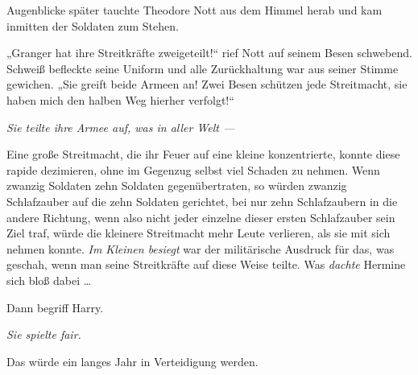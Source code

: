 Augenblicke später tauchte Theodore Nott aus dem Himmel herab und kam inmitten der Soldaten zum Stehen.

„Granger hat ihre Streitkräfte zweigeteilt!“ rief Nott auf seinem Besen schwebend. Schweiß befleckte seine Uniform und alle Zurückhaltung war aus seiner Stimme gewichen.
„Sie greift beide Armeen an! Zwei Besen schützen jede Streitmacht, sie haben mich den halben Weg hierher verfolgt!“

\emph{Sie teilte ihre Armee auf, was in aller Welt —}

Eine große Streitmacht, die ihr Feuer auf eine kleine konzentrierte, konnte diese rapide dezimieren, ohne im Gegenzug selbst viel Schaden zu nehmen. Wenn zwanzig Soldaten zehn Soldaten gegenübertraten, so würden zwanzig Schlafzauber auf die zehn Soldaten gerichtet, bei nur zehn Schlafzaubern in die andere Richtung, wenn also nicht jeder einzelne dieser ersten Schlafzauber sein Ziel traf, würde die kleinere Streitmacht mehr Leute verlieren, als sie mit sich nehmen konnte. \emph{Im Kleinen besiegt} war der militärische Ausdruck für das, was geschah, wenn man seine Streitkräfte auf diese Weise teilte. Was \emph{dachte} Hermine sich bloß dabei … %

Dann begriff Harry.

\emph{Sie spielte fair.}

Das würde ein langes Jahr in Verteidigung werden.

